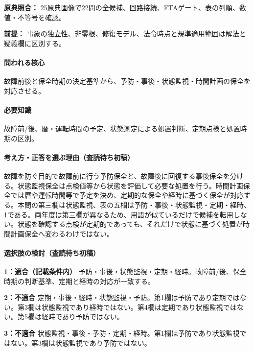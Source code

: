 \noindent\textbf{原典照合：} 25原典画像で22問の全候補、回路接続、FTAゲート、表の列順、数値・不等号を確認。\par

\noindent\textbf{前提：} 事象の独立性、非零根、修復モデル、法令時点と規準適用範囲は解法と疑義欄に区別する。\par

\paragraph{問われる核心} 故障前後と保全時期の決定基準から、予防・事後・状態監視・時間計画の保全を対応させる。

\paragraph{必要知識} 故障前/後、暦・運転時間の予定、状態測定による処置判断、定期点検と処置時期の区別。

\paragraph{考え方・正答を選ぶ理由（査読待ち初稿）} 故障を防ぐ目的で故障前に行う予防保全と、故障後に回復する事後保全を分ける。状態監視保全は点検値等から状態を評価して必要な処置を行う。時間計画保全では暦や運転時間等で予定を決め、定期的な保全や経時に基づく保全が対応する。本問の第三欄は状態監視、表の五欄は予防・事後・状態監視・定期・経時、1である。両年度は第三欄が異なるため、用語が似ているだけで候補を転用しない。状態を確認する点検が定期的であっても、それだけで状態に基づく処置が時間計画保全へ変わるわけではない。

\paragraph{選択肢の検討（査読待ち初稿）}\mbox{}\par

\noindent\textbf{1：適合（記載条件内）} 予防・事後・状態監視・定期・経時。故障前/後、保全時期の判断基準、定期と経時の対応が一致する。\par

\noindent\textbf{2：不適合} 定期・事後・経時・状態監視・予防。第1欄は予防であり定期ではない。第3欄は状態監視であり経時ではない。第4欄は定期であり状態監視ではない。第5欄は経時であり予防ではない。\par

\noindent\textbf{3：不適合} 状態監視・事後・予防・定期・経時。第1欄は予防であり状態監視ではない。第3欄は状態監視であり予防ではない。\par

